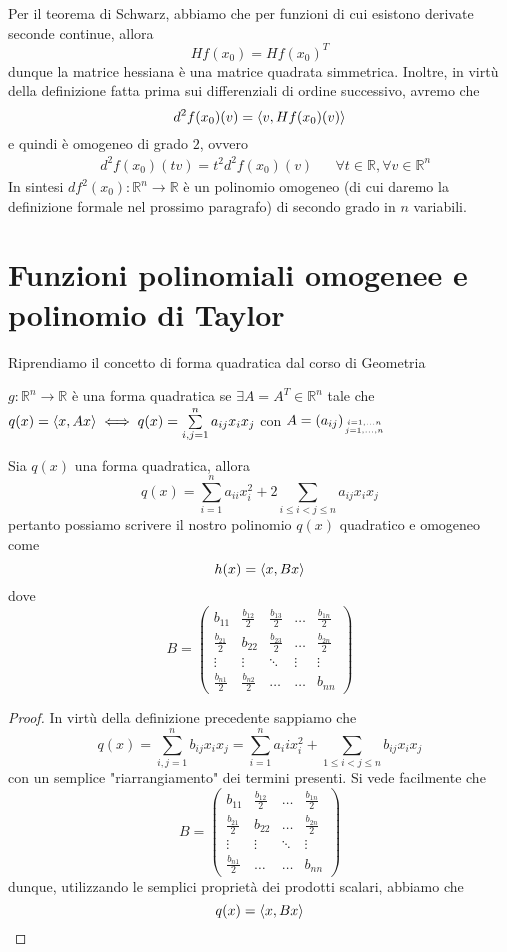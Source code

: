 Per il teorema di Schwarz, abbiamo che per funzioni di cui esistono derivate seconde continue, allora 
$$
Hf(x_0) = Hf(x_0)^T
$$
dunque la matrice hessiana è una matrice quadrata simmetrica. Inoltre, in virtù della definizione fatta prima sui differenziali di ordine successivo, avremo che
$$
d^2 f(x_0)(v) = \langle v, Hf(x_0)(v) \rangle
$$
e quindi è omogeneo di grado $2$, ovvero
\begin{align*}
&d^2 f(x_0)(tv) = t^2 d^2 f(x_0)(v) & &\forall t \in \mathbb{R}, \forall v \in \mathbb{R}^n
\end{align*}
In sintesi $df^2 (x_0): \mathbb{R}^n \to \mathbb{R}$ è un polinomio omogeneo (di cui daremo la definizione formale nel prossimo paragrafo) di secondo grado in $n$ variabili. \\
\section{Funzioni polinomiali omogenee e polinomio di Taylor}
Riprendiamo il concetto di forma quadratica dal corso di Geometria
\begin{definition}
$g: \mathbb{R}^n \to \mathbb{R}$ è una forma quadratica se $\exists A = A^T \in \mathbb{R}^n$ tale che $q(x)=\langle x, Ax \rangle \iff q(x) = \sum\limits_{i,j=1}^n a_{ij}x_i x_j$ con $A = (a_{ij})_{i=1, \ldots n \atop j=1, \ldots, n}$
\end{definition}
\begin{prop}
Sia $q(x)$ una forma quadratica, allora 
$$
q(x) = \sum_{i=1}^n a_{ii}x_i^2 + 2 \sum_{i \leq i < j \leq n} a_{ij} x_i x_j
$$
pertanto possiamo scrivere il nostro polinomio $q(x)$ quadratico e omogeneo come
$$
h(x) = \langle x, Bx \rangle
$$
dove
\begin{equation*}
B = \begin{pmatrix}
b_{11} & \frac{b_{12}}{2} & \frac{b_{13}}{2} & \ldots & \frac{b_{1n}}{2} \\
\frac{b_{21}}{2} & b_{22} & \frac{b_{23}}{2} & \ldots & \frac{b_{2n}}{2} \\
\vdots & \vdots & \ddots & \vdots & \vdots \\
\frac{b_{n1}}{2} & \frac{b_{n2}}{2} & \ldots & \ldots & b_{nn}
\end{pmatrix}
\end{equation*}
\end{prop}
\begin{proof}
In virtù della definizione precedente sappiamo che 
$$
q(x) = \sum_{i, j=1}^n b_{ij} x_i x_j = \sum_{i=1}^n a_ii x_i^2 + \sum_{1 \leq i < j \leq n} b_{ij} x_i x_j 
$$
con un semplice "riarrangiamento" dei termini presenti. Si vede facilmente che
$$
B = \begin{pmatrix}
b_{11} & \frac{b_{12}}{2} & \ldots & \frac{b_{1n}}{2} \\
\frac{b_{21}}{2} & b_{22} & \ldots & \frac{b_{2n}}{2} \\
\vdots & \vdots & \ddots & \vdots \\
\frac{b_{n1}}{2} & \ldots & \ldots & b_{nn}
\end{pmatrix}
$$
dunque, utilizzando le semplici proprietà dei prodotti scalari, abbiamo che
$$
 q(x) = \langle x, Bx \rangle
$$
\end{proof}
